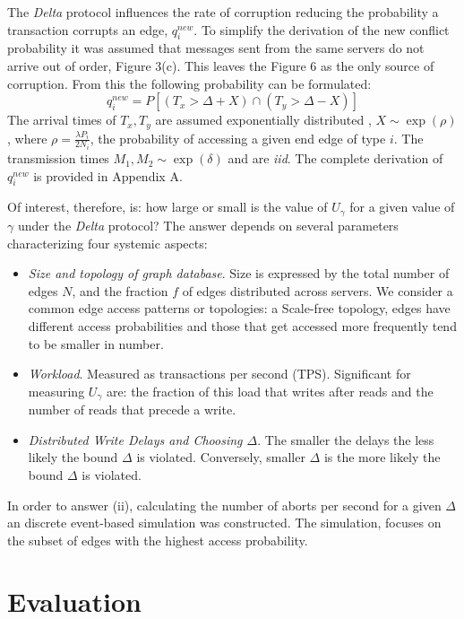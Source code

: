 \documentclass[sigplan,10pt]{acmart}
\begin{document}
The \emph{Delta} protocol influences the rate of corruption reducing the probability a transaction corrupts an edge, $q^{new}_i$. To simplify the derivation of the new conflict probability it was assumed that messages sent from the same servers do not arrive out of order, Figure 3(c). This leaves the Figure 6 as the only source of corruption. From this the following probability can be formulated:
$$ q^{new}_i = P \left[ ( T_x >  \Delta + X) \cap (T_y > \Delta-X) \right]$$
The arrival times of $T_x,T_y$ are assumed exponentially distributed , $X \sim \exp (\rho)$, where $\rho = \frac{\lambda P_i}{2N_i}$, the probability of accessing a given end edge of type $i$. The transmission times $M_1, M_2 \sim \exp (\delta)$ and are \emph{iid}. The complete derivation of $q^{new}_i$ is provided in Appendix A.

Of interest, therefore, is: how large or small is the value of $U_\gamma$ for a given value of $\gamma$ under the \emph{Delta} protocol? The answer depends on several parameters characterizing four systemic aspects:
\begin{itemize}
\item \emph{Size and topology of graph database}. Size is expressed by the total number of edges $N$, and the fraction $f$ of edges distributed across servers. We consider a common edge access patterns or topologies: a Scale-free topology, edges have different access probabilities and those that get accessed more frequently tend to be smaller in number.
\item \emph{Workload}. Measured as transactions per second (TPS). Significant for measuring $U_{\gamma}$ are: the fraction of this load that writes after reads and the number of reads that precede a write.
\item \emph{Distributed Write Delays and Choosing $\Delta$}. The smaller the delays the less likely the bound $\Delta$ is violated. Conversely, smaller $\Delta$ is the more likely the bound $\Delta$ is violated.
\end{itemize}

In order to answer (ii), calculating the number of aborts per second for a given $\Delta$ an discrete event-based simulation was constructed. The simulation, focuses on the subset of edges with the highest access probability.


\section{Evaluation}
\label{sec:evaluation}
\end{document}
